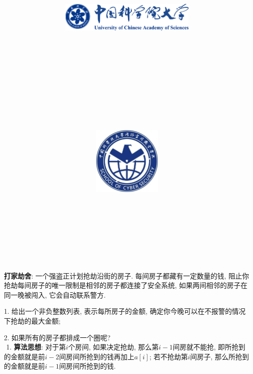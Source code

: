 \documentclass{article}
\title{
	\includegraphics[width=0.5\textwidth]{images/title/ucas_logo 1.pdf}\\
    \vspace{1in}
    \textmd{\textbf{\hmwkClass}}\\
	\textmd{\Large{\textbf{\hmwkClassID}}}\\
    \textmd{\textbf{\hmwkTitle}}\\
    \normalsize\vspace{0.1in}\large{\hmwkCompleteTime }\\
    \vspace{0.1in}\large{\textit{\hmwkClassInstructor\ }}\\
    \vspace{1in}
	\includegraphics[width=0.25\textwidth]{images/title/Cyber.jpg}\\
	\vspace{1in}
}
\author{
	\hmwkAuthorName \\ 
	\hmwkAuthorStuID \\
	\hmwkAuthorInst \\
	\hmwkAuthorzhuanye \\
	\hmwkAuthorfangxiang
	}
\date{}
\begin{document}
\maketitle


%
%
%
%
%


\begin{homeworkProblem}
	\textbf{打家劫舍}: 一个强盗正计划抢劫沿街的房子. 每间房子都藏有一定数量的钱, 阻止你抢劫每间房子的唯一限制是相邻的房子都连接了安全系统, 如果两间相邻的房子在同一晚被闯入, 它会自动联系警方.

	1. 给出一个非负整数列表, 表示每所房子的金额, 确定你今晚可以在不报警的情况下抢劫的最大金额;

	2. 如果所有的房子都排成一个圈呢?
	\\

	\solution \,\,1. \textbf{算法思想}: 对于第$i$个房间, 如果决定抢劫, 那么第$i-1$间房就不能抢, 即所抢到的金额就是前$i-2$间房间所抢到的钱再加上$a[i]$; 若不抢劫第$i$间房子, 那么所抢到的金额就是前$i-1$间房间所抢到的钱.
	

\end{homeworkProblem}
\end{document}
